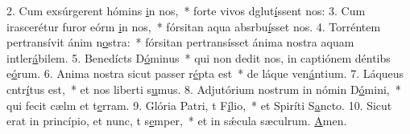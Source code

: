 2. Cum exsúrgerent hómins \uline{i}n nos,~* forte vivos dglut\uline{í}ssent nos:
3. Cum irascerétur furor eórm \uline{i}n nos,~* fórsitan aqua absrbu\uline{í}sset nos.
4. Torréntem pertransívit ánim n\uline{o}stra:~* fórsitan pertransísset ánima nostra aquam intler\uline{á}bilem.
5. Benedícts D\uline{ó}minus~* qui non dedit nos, in captiónem déntibs e\uline{ó}rum.
6. Anima nostra sicut passer r\uline{é}pta est~* de láque ven\uline{á}ntium.
7. Láqueus cntr\uline{í}tus est,~* et nos liberti s\uline{u}mus.
8. Adjutórium nostrum in nómin D\uline{ó}mini,~* qui fecit cælm et t\uline{e}rram.
9. Glória Patri, t F\uline{í}lio,~* et Spiríti S\uline{a}ncto.
10. Sicut erat in princípio, et nunc, t s\uline{e}mper,~* et in sǽcula sæculrum. \uline{A}men.
